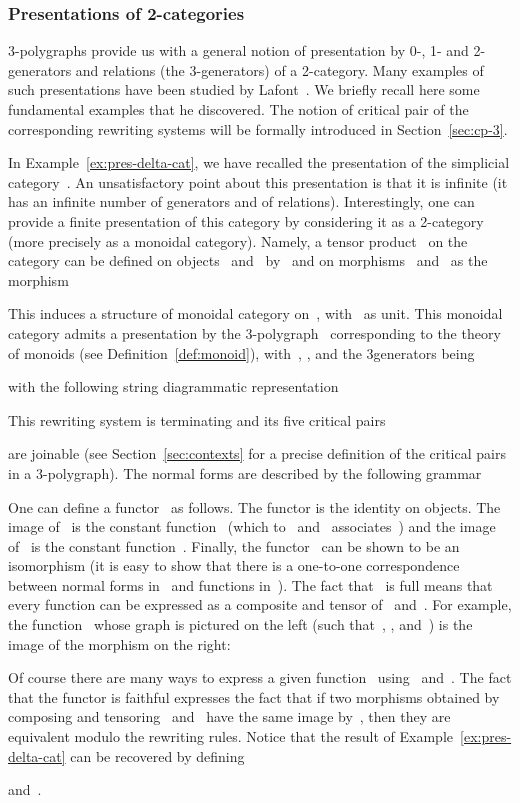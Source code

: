 \documentclass{LMCS}
\begin{document}
\subsubsection{Presentations of 2-categories}
3-polygraphs provide us with a general notion of presentation by 0-, 1- and
2-generators and relations (the 3-generators) of a 2-category. Many examples of
such presentations have been studied by
Lafont~\cite{lafont:boolean-circuits}. We briefly recall here some fundamental
examples that he discovered. The notion of critical pair of the corresponding
rewriting systems will be formally introduced in Section~\ref{sec:cp-3}.

\begin{exa}
  \label{ex:simpl-2-pres}
  In Example~\ref{ex:pres-delta-cat}, we have recalled the presentation of the
  simplicial category~. An unsatisfactory point about this presentation
  is that it is infinite (it has an infinite number of generators and of
  relations). Interestingly, one can provide a finite presentation of this
  category by considering it as a 2-category (more precisely as a monoidal
  category). Namely, a tensor product~ on the category can be defined
  on objects~ and~ by~ and on morphisms~
  and~ as the morphism 
  
  This induces a structure of monoidal category on~, with~ as
  unit. This monoidal category admits a presentation by the 3-polygraph~
  corresponding to the theory of monoids (see Definition~\ref{def:monoid}),
  with~, ,
\hbox{} and the 3\nbd{}generators being
  
  with the following string diagrammatic representation
  
  This rewriting system is terminating and its five critical pairs
  
  are joinable (see Section~\ref{sec:contexts} for a precise definition of the
  critical pairs in a 3-polygraph). The normal forms are described by the
  following grammar
  
  One can define a functor~ as follows. The
  functor is the identity on objects. The image of~ is the constant
  function~ (which to~ and~ associates~) and the image
  of~ is the constant function~. Finally, the functor~
  can be shown to be an isomorphism (it is easy to show that there is a
  one-to-one correspondence between normal forms in~ and functions
  in~). The fact that~ is full means that every function can be
  expressed as a composite and tensor of~ and~. For example, the
  function~ whose graph is pictured on the left (such that~,
  ,  and~) is the image of the morphism on the right:
  
  Of course there are many ways to express a given function~ using~
  and~. The fact that the functor is faithful expresses the fact that if two
  morphisms obtained by composing and tensoring~ and~ have the same
  image by~, then they are equivalent modulo the rewriting rules. Notice that
  the result of Example~\ref{ex:pres-delta-cat} can be recovered by defining
  
  and~.
\end{exa}
\end{document}

